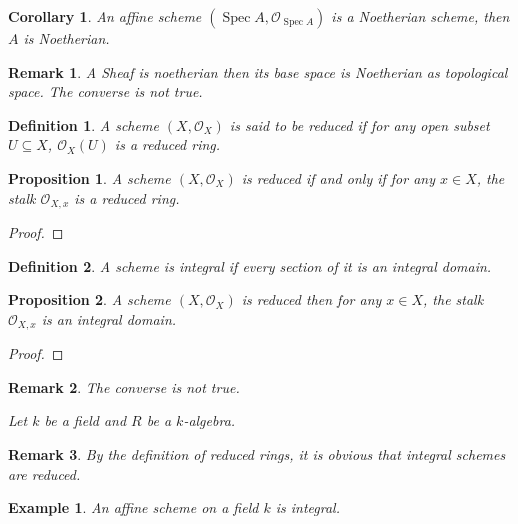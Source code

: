 \documentclass{article}
\newtheorem{proposition}{Proposition}[section]
\newtheorem{definition}{Definition}[section]
\newtheorem{remark}{Remark}[section]
\newtheorem{corollary}{Corollary}[section]
\newtheorem{example}{Example}[section]
\numberwithin{equation}{section}
\DeclareMathOperator{\Spec}{Spec}
\begin{document}
\begin{corollary}
An affine scheme $(\Spec A,\mathcal{O}_{\Spec A})$ is a Noetherian scheme, then $A$ is Noetherian.
\end{corollary}

\begin{remark}
A Sheaf is noetherian then its base space is Noetherian as topological space. The converse is not true.
\end{remark}

\begin{definition}
A scheme $(X,\mathcal{O}_X)$ is said to be reduced if for any open subset $U\subseteq X$, $\mathcal{O}_X(U)$ is a reduced ring.
\end{definition}

\begin{proposition}
A scheme $(X,\mathcal{O}_X)$ is reduced if and only if for any $x\in X$, the stalk $\mathcal{O}_{X,x}$ is a reduced ring.
\end{proposition}

\begin{proof}
\end{proof}

\begin{definition}
A scheme is integral if every section of it is an integral domain.
\end{definition}

\begin{proposition}
A scheme $(X,\mathcal{O}_X)$ is reduced then for any $x\in X$, the stalk $\mathcal{O}_{X,x}$ is an integral domain.
\end{proposition}

\begin{proof}
\end{proof}

\begin{remark}
The converse is not true.\\
\par Let $k$ be a field and $R$ be a $k$-algebra. %
\end{remark}

\begin{remark}
By the definition of reduced rings, it is obvious that integral schemes are reduced.
\end{remark}

\begin{example}
An affine scheme on a field $k$ is integral.%
\end{example}
\end{document}

